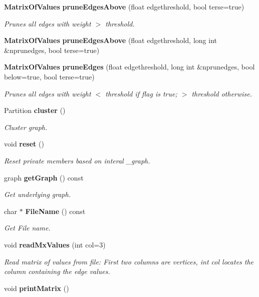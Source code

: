 \begin{CompactItemize}
\item 
{\bf Matrix\-Of\-Values} {\bf prune\-Edges\-Above} (float edgethreshold, bool terse=true)\label{classMatrixOfValues_a6}

\begin{CompactList}\small\item\em Prunes all edges with weight $>$ threshold. \item\end{CompactList}\item 
{\bf Matrix\-Of\-Values} {\bf prune\-Edges\-Above} (float edgethreshold, long int \&nprunedges, bool terse=true)\label{classMatrixOfValues_a7}

\item 
{\bf Matrix\-Of\-Values} {\bf prune\-Edges} (float edgethreshold, long int \&nprunedges, bool below=true, bool terse=true)
\begin{CompactList}\small\item\em Prunes all edges with weight $<$ threshold if flag is true; $>$ threshold otherwise. \item\end{CompactList}\item 
Partition {\bf cluster} ()
\begin{CompactList}\small\item\em Cluster graph. \item\end{CompactList}\item 
void {\bf reset} ()\label{classMatrixOfValues_a10}

\begin{CompactList}\small\item\em Reset private members based on interal \_\-graph. \item\end{CompactList}\item 
graph {\bf get\-Graph} () const\label{classMatrixOfValues_a11}

\begin{CompactList}\small\item\em Get underlying graph. \item\end{CompactList}\item 
char $\ast$ {\bf File\-Name} () const\label{classMatrixOfValues_a12}

\begin{CompactList}\small\item\em Get File name. \item\end{CompactList}\item 
void {\bf read\-Mx\-Values} (int col=3)
\begin{CompactList}\small\item\em Read matrix of values from file: First two columns are vertices, int col locates the column containing the edge values. \item\end{CompactList}\item 
void {\bf print\-Matrix} ()\label{classMatrixOfValues_a14}


\end{CompactItemize}
